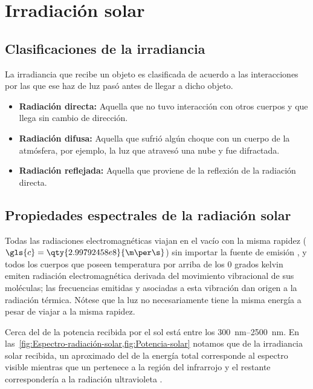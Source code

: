 \section{Irradiación solar}

	\subsection{Clasificaciones de la irradiancia}
			
		La irradiancia que recibe un objeto es clasificada de acuerdo a las interacciones por las que ese haz de luz pasó antes de llegar a dicho objeto.
		
		\begin{itemize}
			\item \textbf{Radiación directa:} Aquella que no tuvo interacción con otros cuerpos y que llega sin cambio de dirección.
			\item \textbf{Radiación difusa:} Aquella que sufrió algún choque con un cuerpo de la atmósfera, por ejemplo, la luz que atravesó una nube y fue difractada.
			\item \textbf{Radiación reflejada:} Aquella que proviene de la reflexión de la radiación directa.
		\end{itemize}
	
	\subsection{Propiedades espectrales de la radiación solar}
		
		Todas las radiaciones electromagnéticas viajan en el vacío con la misma rapidez ($\gls{c} = \qty{2.99792458e8}{\m\per\s}$) sin importar la fuente de emisión \cite{young_fisica_2009}, y todos los cuerpos que poseen temperatura por arriba de los 0 grados kelvin emiten radiación electromagnética derivada del movimiento vibracional de sus moléculas; las frecuencias emitidas y asociadas a esta vibración dan origen a la radiación térmica. Nótese que la luz no necesariamente tiene la misma energía a pesar de viajar a la misma rapidez.
		
		Cerca del  de la potencia recibida por el sol está entre los \qtyrange{300}{2500}{\nm}. En las~\cref{fig:Espectro-radiación-solar,fig:Potencia-solar} notamos que de la irradiancia solar recibida, un aproximado del  de la energía total corresponde al espectro visible mientras que un  pertenece a la región del infrarrojo y el  restante correspondería a la radiación ultravioleta \cite{weinstein_spectral_nodate}.
		
